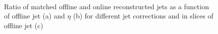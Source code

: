  \begin{figure}[hbtp]
    \centering
{}
\hfill
{} \\
\caption[Jet response as a function of jet \pt and $\eta$]{Ratio of matched offline and online reconstructed jets as a
function of offline jet \pt (a) and $\eta$ (b) for different jet corrections and in slices of offline jet \pt (c)}
\label{fig:top_hlt_jet_response} 
 \end{figure}

